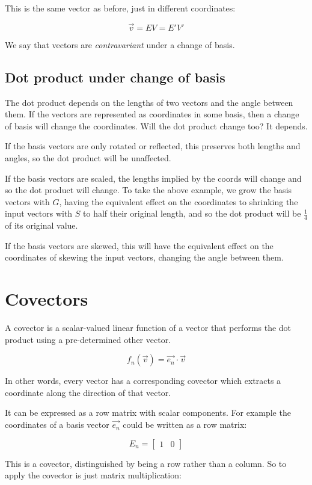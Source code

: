 This is the same vector as before, just in different coordinates:

$$\vec{v} = EV = E'V'$$

We say that vectors are \textit{contravariant} under a change of basis.

\subsection{Dot product under change of basis}

The dot product depends on the lengths of two vectors and the angle between them. If the vectors are represented as coordinates in some basis, then a change of basis will change the coordinates. Will the dot product change too? It depends.

If the basis vectors are only rotated or reflected, this preserves both lengths and angles, so the dot product will be unaffected.

If the basis vectors are scaled, the lengths implied by the coords will change and so the dot product will change. To take the above example, we grow the basis vectors with $G$, having the equivalent effect on the coordinates to shrinking the input vectors with $S$ to half their original length, and so the dot product will be $\frac{1}{4}$ of its original value.

If the basis vectors are skewed, this will have the equivalent effect on the coordinates of skewing the input vectors, changing the angle between them.

\section{Covectors}

A covector is a scalar-valued linear function of a vector that performs the dot product using a pre-determined other vector.

$$f_n(\vec{v}) = \vec{e_n} \cdot \vec{v}$$

In other words, every vector has a corresponding covector which extracts a coordinate along the direction of that vector.

It can be expressed as a row matrix with scalar components. For example the coordinates of a basis vector $\vec{e_n}$ could be written as a row matrix:

$$E_n = \begin{bmatrix}1 & 0\end{bmatrix}$$

This is a covector, distinguished by being a row rather than a column. So to apply the covector is just matrix multiplication:

